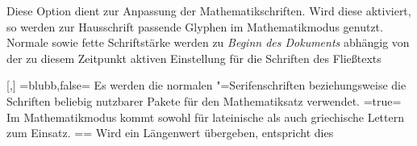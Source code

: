 \documentclass[english,ngerman,ToDo=inline,indexnote=false]{tudscrmanual}
\begin{document}
\begin{Entity}{}
\begin{Declaration}
  {}
\begin{Declaration}
  {}
\begin{Declaration}
  {}
\printdeclarationlist
%
Diese Option dient zur Anpassung der Mathematikschriften. Wird diese aktiviert, 
so werden zur Hausschrift passende Glyphen im Mathematikmodus genutzt. Normale 
sowie fette Schriftstärke werden zu \emph{Beginn des Dokuments} abhängig von 
der zu diesem Zeitpunkt aktiven Einstellung für die Schriften des Fließtexts 
\begin{DeclareValues}%
  [,]
\itemval=blubb,false=
  Es werden die normalen "=Serifenschriften beziehungsweise die 
  Schriften beliebig nutzbarer Pakete für den Mathematiksatz verwendet.
\itemval*=true=
  Im Mathematikmodus kommt \OpenSans sowohl für lateinische als auch 
  griechische Lettern zum Einsatz.
\itemval=\PLength=
  Wird ein Längenwert übergeben, entspricht dies 
\end{DeclareValues}
\end{Declaration}
\end{Declaration}
\end{Declaration}
\end{Entity}
\end{document}
